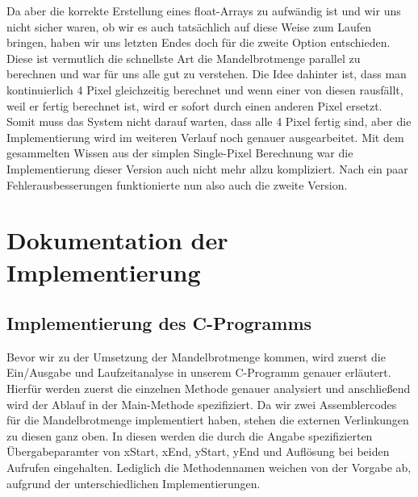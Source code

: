\documentclass[11pt]{scrartcl}
\begin{document}
Da aber die korrekte Erstellung eines float-Arrays zu aufwändig ist und wir uns nicht sicher waren, ob wir es auch tatsächlich auf diese Weise zum Laufen bringen,
haben wir uns letzten Endes doch für die zweite Option entschieden.
Diese ist vermutlich die schnellste Art die Mandelbrotmenge parallel zu berechnen und war für uns alle gut zu verstehen.
Die Idee dahinter ist, dass man kontinuierlich 4 Pixel gleichzeitig berechnet und wenn einer von diesen rausfällt, weil er fertig berechnet ist, wird er sofort durch einen anderen Pixel ersetzt.
Somit muss das System nicht darauf warten, dass alle 4 Pixel fertig sind, aber die Implementierung wird im weiteren Verlauf noch genauer ausgearbeitet.
Mit dem gesammelten Wissen aus der simplen Single-Pixel Berechnung war die Implementierung dieser Version auch nicht mehr allzu kompliziert.
Nach ein paar Fehlerausbesserungen funktionierte nun also auch die zweite Version.


\section{Dokumentation der Implementierung}
\subsection{Implementierung des C-Programms}
Bevor wir zu der Umsetzung der Mandelbrotmenge kommen, wird zuerst die Ein/Ausgabe und Laufzeitanalyse in unserem C-Programm genauer erläutert.
Hierfür werden zuerst die einzelnen Methode genauer analysiert und anschließend wird der Ablauf in der Main-Methode spezifiziert.
Da wir zwei Assemblercodes für die Mandelbrotmenge implementiert haben, stehen die externen Verlinkungen zu diesen ganz oben.
In diesen werden die durch die Angabe spezifizierten Übergabeparamter von xStart, xEnd, yStart, yEnd und Auflösung bei beiden Aufrufen eingehalten.
Lediglich die Methodennamen weichen von der Vorgabe ab, aufgrund der unterschiedlichen Implementierungen.
\end{document}
